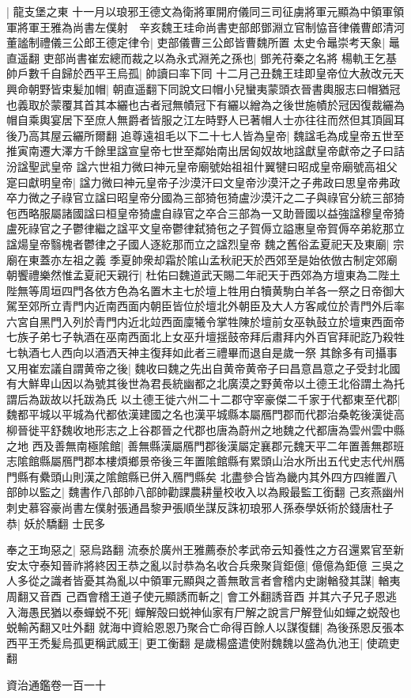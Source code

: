 |{
	龍支堡之東}
十一月以琅邪王德文為衛將軍開府儀同三司征虜將軍元顯為中領軍領軍將軍王雅為尚書左僕射　辛亥魏王珪命尚書吏部郎鄧淵立官制恊音律儀曹郎清河董謐制禮儀三公郎王德定律令|{
	吏部儀曹三公郎皆曹魏所置}
太史令鼂崇考天象|{
	鼂直遥翻}
吏部尚書崔宏總而裁之以為永式淵羌之孫也|{
	鄧羌苻秦之名將}
楊軌王乞基帥戶數千自歸於西平王烏孤|{
	帥讀曰率下同}
十二月己丑魏王珪即皇帝位大赦改元天興命朝野皆束髪加帽|{
	朝直遥翻下同說文曰帽小兒蠻夷蒙頭衣晉書輿服志曰帽猶冠也義取於蒙覆其首其本纚也古者冠無幘冠下有纚以繒為之後世施幘於冠因復裁纚為帽自乘輿宴居下至庶人無爵者皆服之江左時野人已著帽人士亦往往而然但其頂圓耳後乃高其屋云纚所爾翻}
追尊遠祖毛以下二十七人皆為皇帝|{
	魏諡毛為成皇帝五世至推寅南遷大澤方千餘里諡宣皇帝七世至鄰始南出居匈奴故地諡獻皇帝獻帝之子曰詰汾諡聖武皇帝}
諡六世祖力微曰神元皇帝廟號始祖祖什翼犍曰昭成皇帝廟號高祖父寔曰獻明皇帝|{
	諡力微曰神元皇帝子沙漠汗曰文皇帝沙漠汗之子弗政曰思皇帝弗政卒力微之子祿官立諡曰昭皇帝分國為三部猗㐌猗盧沙漠汗之二子與祿官分統三部猗㐌西略服屬諸國諡曰桓皇帝猗盧自祿官之卒合三部為一又助晉國以益強諡穆皇帝猗盧死祿官之子鬱律繼之諡平文皇帝鬱律弑猗㐌之子賀傉立謚惠皇帝賀傉卒弟紇那立諡煬皇帝翳槐者鬱律之子國人逐紇那而立之諡烈皇帝}
魏之舊俗孟夏祀天及東廟|{
	宗廟在東蓋亦左祖之義}
季夏帥衆却霜於隂山孟秋祀天於西郊至是始依倣古制定郊廟朝饗禮樂然惟孟夏祀天親行|{
	杜佑曰魏道武天賜二年祀天于西郊為方壇東為二陛土陛無等周垣四門各依方色為名置木主七於壇上牲用白犢黄駒白羊各一祭之日帝御大駕至郊所立青門内近南西面内朝臣皆位於壇北外朝臣及大人方客咸位於青門外后率六宮自黑門入列於青門内近北竝西面廩犧令掌牲陳於壇前女巫執鼓立於壇東西面帝七族子弟七子執酒在巫南西面北上女巫升壇揺鼓帝拜后肅拜内外百官拜祀訖乃殺牲七執酒七人西向以酒洒天神主復拜如此者三禮畢而退自是歲一祭}
其餘多有司攝事又用崔宏議自謂黄帝之後|{
	魏收曰魏之先出自黄帝黄帝子曰昌意昌意之子受封北國有大鮮卑山因以為號其後世為君長統幽都之北廣漠之野黄帝以土德王北俗謂土為托謂后為跋故以托跋為氏}
以土德王徙六州二十二郡守宰豪傑二千家于代都東至代郡|{
	魏都平城以平城為代都依漢建國之名也漢平城縣本屬鴈門郡而代郡治桑乾後漢徙高柳晉徙平舒魏收地形志之上谷郡晉之代郡也唐為蔚州之地魏之代都唐為雲州雲中縣之地}
西及善無南極隂館|{
	善無縣漢屬鴈門郡後漢屬定襄郡元魏天平二年置善無郡班志隂館縣屬鴈門郡本樓煩鄉景帝後三年置隂館縣有累頭山治水所出五代史志代州鴈門縣有纍頭山則漢之隂館縣已併入鴈門縣矣}
北盡參合皆為畿内其外四方四維置八部帥以監之|{
	魏書作八部帥八部帥勸課農耕量校收入以為殿最監工銜翻}
己亥燕幽州刺史慕容豪尚書左僕射張通昌黎尹張順坐謀反誅初琅邪人孫泰學妖術於錢唐杜子恭|{
	妖於驕翻}
士民多

奉之王珣惡之|{
	惡烏路翻}
流泰於廣州王雅薦泰於孝武帝云知養性之方召還累官至新安太守泰知晉祚將終因王恭之亂以討恭為名收合兵衆聚貨鉅億|{
	億億為鉅億}
三吳之人多從之識者皆憂其為亂以中領軍元顯與之善無敢言者會稽内史謝輶發其謀|{
	輶夷周翻又音酉}
己酉會稽王道子使元顯誘而斬之|{
	會工外翻誘音酉}
并其六子兄子恩逃入海愚民猶以泰蟬蜕不死|{
	蟬解殻曰蜕神仙家有尸解之說言尸解登仙如蟬之蜕殻也蜕輸芮翻又吐外翻}
就海中資給恩恩乃聚合亡命得百餘人以謀復讎|{
	為後孫恩反張本}
西平王禿髪烏孤更稱武威王|{
	更工衡翻}
是歲楊盛遣使附魏魏以盛為仇池王|{
	使疏吏翻}


資治通鑑卷一百一十
